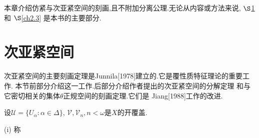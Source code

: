 \documentclass[main.tex]{subfiles}
\begin{document}
本章介绍仿紧与次亚紧空间的刻画,且不附加分离公理.无论从内容或方法来说, $\S$\ref{ch2.1} 和 $\S$\ref{ch2.3} 是本书的主要部分.

\section{次亚紧空间}\label{ch2.1}
次亚紧空间的主要刻画定理是Junnila[1978]建立的.它是覆性质特征理论的重要工作.
本节前部分介绍这一工作.后部分介绍作者提出的次亚紧空间的分解定理
和与它密切相关的集体$\theta$正规空间的刻画定理.它们是 Jiang[1988]工作的改进.

\begin{definition}
	设$\mathscr{U}=\{U_\alpha:\alpha\in\Delta\}$, $\mathscr{V}, \mathscr{V}_n, n<\omega$是$X$的开覆盖.
	
	\textnormal{(i)} 称
\end{definition}	
\end{document}
